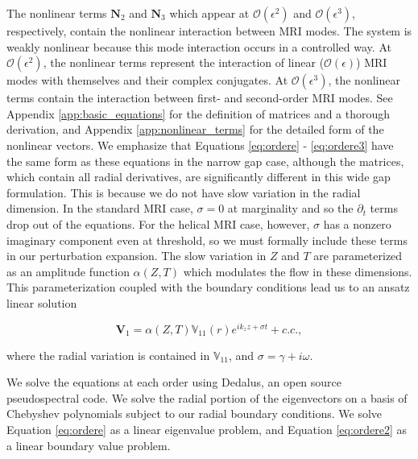 \documentclass{emulateapj}
\newcommand{\beq}{\begin{equation}}
\newcommand{\eeq}{\end{equation}}
\newcommand\reym{\mathrm{Rm}}
\begin{document}
The nonlinear terms $\mathbf{N}_2$ and $\mathbf{N}_3$ which appear at $\mathcal{O}(\epsilon^2)$ and $\mathcal{O}(\epsilon^3)$, respectively, contain the nonlinear interaction between MRI modes. The system is weakly nonlinear because this mode interaction occurs in a controlled way. At $\mathcal{O}(\epsilon^2)$, the nonlinear terms represent the interaction of linear ($\mathcal{O}(\epsilon)$) MRI modes with themselves and their complex conjugates. At $\mathcal{O}(\epsilon^3)$, the nonlinear terms contain the interaction between first- and second-order MRI modes. See Appendix \ref{app:basic_equations} for the definition of matrices and a thorough derivation, and Appendix \ref{app:nonlinear_terms} for the detailed form of the nonlinear vectors. We emphasize that Equations \ref{eq:ordere} - \ref{eq:ordere3} have the same form as these equations in the narrow gap case, although the matrices, which contain all radial derivatives, are significantly different in this wide gap formulation. This is because we do not have slow variation in the radial dimension. In the standard MRI case, $\sigma = 0$ at marginality and so the $\partial_t$ terms drop out of the equations. For the helical MRI case, however, $\sigma$ has a nonzero imaginary component even at threshold, so we must formally include these terms in our perturbation expansion. The slow variation in $Z$ and $T$ are parameterized as an amplitude function $\alpha(Z, T)$ which modulates the flow in these dimensions. This parameterization coupled with the boundary conditions lead us to an ansatz linear solution 

\beq
\label{eq:ansatz}
\mathbf{V}_1 = \alpha(Z, T) \mathbb{V}_{11}(r) e^{i k_z z + \sigma t} + c.c.,
\eeq

where the radial variation is contained in $\mathbb{V}_{11}$, and $\sigma = \gamma + i\omega$. 

We solve the equations at each order using Dedalus, an open source pseudospectral code. We solve the radial portion of the eigenvectors on a basis of Chebyshev polynomials subject to our radial boundary conditions. %
We solve Equation \ref{eq:ordere} as a linear eigenvalue problem, and Equation \ref{eq:ordere2} as a linear boundary value problem. 
\end{document}

